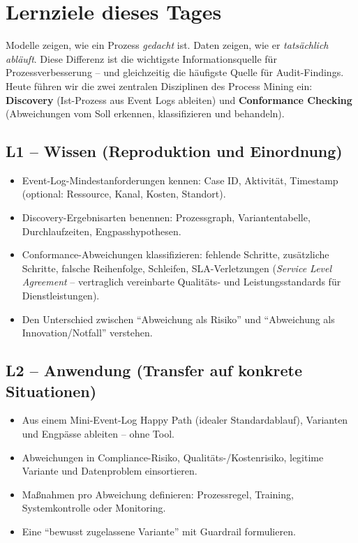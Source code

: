 \documentclass[11pt,a4paper,oneside]{article}
\newcommand{\fachbegriff}[1]{\textbf{#1}}
\begin{document}
\section*{Lernziele dieses Tages}
\thispagestyle{plain}

\noindent Modelle zeigen, wie ein Prozess \emph{gedacht} ist. Daten zeigen, wie er \emph{tatsächlich abläuft}. Diese Differenz ist die wichtigste Informationsquelle für Prozessverbesserung -- und gleichzeitig die häufigste Quelle für Audit-Findings. Heute führen wir die zwei zentralen Disziplinen des Process Mining ein: \fachbegriff{Discovery} (Ist-Prozess aus Event Logs ableiten) und \fachbegriff{Conformance Checking} (Abweichungen vom Soll erkennen, klassifizieren und behandeln).

\subsection*{L1 -- Wissen (Reproduktion und Einordnung)}
\begin{itemize}
  \item Event-Log-Mindestanforderungen kennen: Case ID, Aktivität, Timestamp (optional: Ressource, Kanal, Kosten, Standort).
  \item Discovery-Ergebnisarten benennen: Prozessgraph, Variantentabelle, Durchlaufzeiten, Engpasshypothesen.
  \item Conformance-Abweichungen klassifizieren: fehlende Schritte, zusätzliche Schritte, falsche Reihenfolge, Schleifen, SLA-Verletzungen (\emph{Service Level Agreement} -- vertraglich vereinbarte Qualitäts- und Leistungsstandards für Dienstleistungen).
  \item Den Unterschied zwischen ``Abweichung als Risiko'' und ``Abweichung als Innovation/Notfall'' verstehen.
\end{itemize}

\subsection*{L2 -- Anwendung (Transfer auf konkrete Situationen)}
\begin{itemize}
  \item Aus einem Mini-Event-Log Happy Path (idealer Standardablauf), Varianten und Engpässe ableiten -- ohne Tool.
  \item Abweichungen in Compliance-Risiko, Qualitäts-/Kostenrisiko, legitime Variante und Datenproblem einsortieren.
  \item Maßnahmen pro Abweichung definieren: Prozessregel, Training, Systemkontrolle oder Monitoring.
  \item Eine ``bewusst zugelassene Variante'' mit Guardrail formulieren.
\end{itemize}
\end{document}
